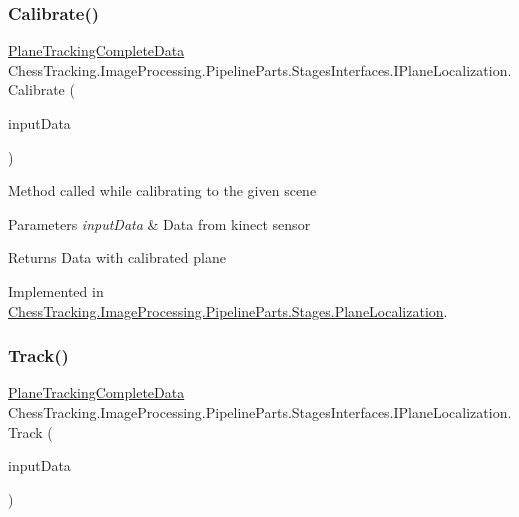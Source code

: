 \subsubsection{\texorpdfstring{Calibrate()}{Calibrate()}}
{\footnotesize\ttfamily \mbox{\hyperlink{class_chess_tracking_1_1_image_processing_1_1_pipeline_data_1_1_plane_tracking_complete_data}{Plane\+Tracking\+Complete\+Data}} Chess\+Tracking.\+Image\+Processing.\+Pipeline\+Parts.\+Stages\+Interfaces.\+I\+Plane\+Localization.\+Calibrate (\begin{DoxyParamCaption}\item[{\mbox{\hyperlink{class_chess_tracking_1_1_image_processing_1_1_pipeline_data_1_1_input_data}{Input\+Data}}}]{input\+Data }\end{DoxyParamCaption})}



Method called while calibrating to the given scene 


\begin{DoxyParams}{Parameters}
{\em input\+Data} & Data from kinect sensor\\
\hline
\end{DoxyParams}
\begin{DoxyReturn}{Returns}
Data with calibrated plane
\end{DoxyReturn}


Implemented in \mbox{\hyperlink{class_chess_tracking_1_1_image_processing_1_1_pipeline_parts_1_1_stages_1_1_plane_localization_a85e3456fc26b865f16bb985efd5e41a7}{Chess\+Tracking.\+Image\+Processing.\+Pipeline\+Parts.\+Stages.\+Plane\+Localization}}.

\mbox{\label{interface_chess_tracking_1_1_image_processing_1_1_pipeline_parts_1_1_stages_interfaces_1_1_i_plane_localization_a03e2c5fc754830f91491a704352c24cf}} 
\subsubsection{\texorpdfstring{Track()}{Track()}}
{\footnotesize\ttfamily \mbox{\hyperlink{class_chess_tracking_1_1_image_processing_1_1_pipeline_data_1_1_plane_tracking_complete_data}{Plane\+Tracking\+Complete\+Data}} Chess\+Tracking.\+Image\+Processing.\+Pipeline\+Parts.\+Stages\+Interfaces.\+I\+Plane\+Localization.\+Track (\begin{DoxyParamCaption}\item[{\mbox{\hyperlink{class_chess_tracking_1_1_image_processing_1_1_pipeline_data_1_1_input_data}{Input\+Data}}}]{input\+Data }\end{DoxyParamCaption})}




